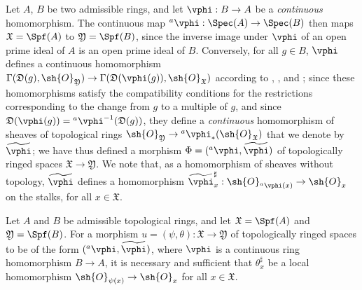 \begin{env}[10.2.1]
\label{I.10.2.1}
Let $A$, $B$ be two admissible rings, and let $\vphi:B\to A$ be a \emph{continuous} homomorphism.
The continuous map ${}^a\vphi:\Spec(A)\to\Spec(B)$  then maps $\mathfrak{X}=\Spf(A)$ to $\mathfrak{Y}=\Spf(B)$, since the inverse image under $\vphi$ of an open prime ideal of $A$ is an open prime ideal of $B$.
Conversely, for all $g\in B$, $\vphi$ defines a continuous homomorphism $\Gamma(\mathfrak{D}(g),\sh{O}_\mathfrak{Y})\to\Gamma(\mathfrak{D}(\vphi(g)),\sh{O}_\mathfrak{X})$ according to , , and ;
since these homomorphisms satisfy the compatibility conditions for the restrictions corresponding to the change from $g$ to a multiple of $g$, and since $\mathfrak{D}(\vphi(g))={}^a\vphi^{-1}(\mathfrak{D}(g))$, they define a \emph{continuous} homomorphism of sheaves of topological rings $\sh{O}_\mathfrak{Y}\to{}^a\vphi_*(\sh{O}_\mathfrak{X})$  that we denote by $\widetilde{\vphi}$;
we have thus defined a morphism $\Phi=({}^a\vphi,\widetilde{\vphi})$ of topologically ringed spaces $\mathfrak{X}\to\mathfrak{Y}$.
We note that, as a homomorphism of sheaves without topology, $\widetilde{\vphi}$ defines a homomorphism $\widetilde{\vphi}_x^\sharp:\sh{O}_{{}^a\vphi(x)}\to\sh{O}_x$ on the stalks, for all $x\in\mathfrak{X}$.
\end{env}

\begin{proposition}[10.2.2]
\label{I.10.2.2}
Let $A$ and $B$ be admissible topological rings, and let $\mathfrak{X}=\Spf(A)$ and $\mathfrak{Y}=\Spf(B)$.
For a morphism $u=(\psi,\theta):\mathfrak{X}\to\mathfrak{Y}$ of topologically ringed spaces to be of the form $({}^a\vphi,\widetilde{\vphi})$, where $\vphi$ is a continuous ring homomorphism $B\to A$, it is necessary and sufficient that $\theta_x^\sharp$ be a local homomorphism $\sh{O}_{\psi(x)}\to\sh{O}_x$ for all $x\in\mathfrak{X}$.
\end{proposition}

